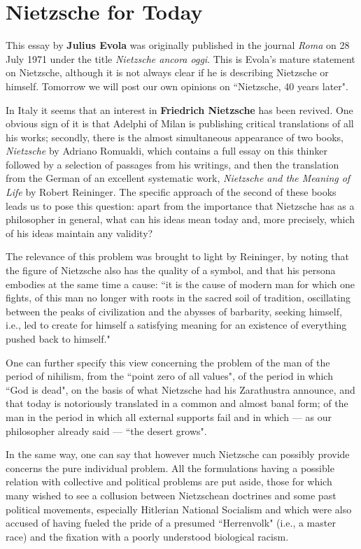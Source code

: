 \section{Nietzsche for Today}

\begin{quotex}
This essay by \textbf{Julius Evola} was originally published in the journal \textit{Roma} on 28 July 1971 under the title \textit{Nietzsche ancora oggi}. This is Evola's mature statement on Nietzsche, although it is not always clear if he is describing Nietzsche or himself. Tomorrow we will post our own opinions on ``Nietzsche, 40 years later". 
\end{quotex}

In Italy it seems that an interest in \textbf{Friedrich Nietzsche} has been revived. One obvious sign of it is that Adelphi of Milan is publishing critical translations of all his works; secondly, there is the almost simultaneous appearance of two books, \emph{Nietzsche} by Adriano Romualdi, which contains a full essay on this thinker followed by a selection of passages from his writings, and then the translation from the German of an excellent systematic work, \emph{Nietzsche and the Meaning of Life} by Robert Reininger. The specific approach of the second of these books leads us to pose this question: apart from the importance that Nietzsche has as a philosopher in general, what can his ideas mean today and, more precisely, which of his ideas maintain any validity?

The relevance of this problem was brought to light by Reininger, by noting that the figure of Nietzsche also has the quality of a symbol, and that his persona embodies at the same time a cause: ``it is the cause of modern man for which one fights, of this man no longer with roots in the sacred soil of tradition, oscillating between the peaks of civilization and the abysses of barbarity, seeking himself, i.e., led to create for himself a satisfying meaning for an existence of everything pushed back to himself."

One can further specify this view concerning the problem of the man of the period of nihilism, from the ``point zero of all values", of the period in which ``God is dead", on the basis of what Nietzsche had his Zarathustra announce, and that today is notoriously translated in a common and almost banal form; of the man in the period in which all external supports fail and in which — as our philosopher already said — ``the desert grows".

In the same way, one can say that however much Nietzsche can possibly provide concerns the pure individual problem. All the formulations having a possible relation with collective and political problems are put aside, those for which many wished to see a collusion between Nietzschean doctrines and some past political movements, especially Hitlerian National Socialism and which were also accused of having fueled the pride of a presumed ``Herrenvolk" (i.e., a master race) and the fixation with a poorly understood biological racism.

